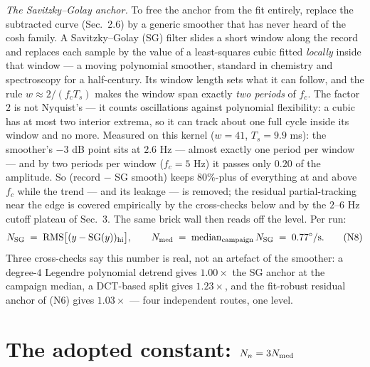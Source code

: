 \documentclass[10pt]{article}
\newcommand{\rms}{\mathrm{RMS}}
\begin{document}
\emph{The Savitzky--Golay anchor.} To free the anchor from the fit
entirely, replace the subtracted curve (Sec.~2.6) by a generic
smoother that has never heard of the cosh family. A Savitzky--Golay
(SG) filter slides a short window along the record and replaces each
sample by the value of a least-squares cubic fitted \emph{locally}
inside that window --- a moving polynomial smoother, standard in
chemistry and spectroscopy for a half-century. Its window length sets
what it can follow, and the rule $w \approx 2/(f_c T_s)$ makes the
window span exactly \emph{two periods} of $f_c$. The factor $2$ is
not Nyquist's --- it counts oscillations against polynomial
flexibility: a cubic has at most two interior extrema, so it can
track about one full cycle inside its window and no more. Measured
on this kernel ($w = 41$, $T_s = 9.9$ ms): the smoother's $-3$ dB
point sits at $2.6$ Hz --- almost exactly one period per window ---
and by two periods per window ($f_c = 5$ Hz) it passes only $0.20$
of the amplitude. So (record $-$ SG smooth) keeps $80\%$-plus of
everything at and above $f_c$ while the trend --- and its leakage
--- is removed; the residual partial-tracking near the edge is
covered empirically by the cross-checks below and by the
$2$--$6$ Hz cutoff plateau of Sec.~3. The same brick wall then reads
off the level. Per run:
\begin{equation}
  N_{\rm SG} \;=\; \rms\big[(y - \mathrm{SG}(y))_{\rm hi}\big],
  \qquad
  N_{\rm med} \;=\; \mathrm{median}_{\rm campaign}\, N_{\rm SG}
  \;=\; 0.77^\circ/\text{s}.
  \tag{N8}
\end{equation}
Three cross-checks say this number is real, not an artefact of the
smoother: a degree-$4$ Legendre polynomial detrend gives
$1.00\times$ the SG anchor at the campaign median, a DCT-based split
gives $1.23\times$, and the fit-robust residual anchor of (N6) gives
$1.03\times$ --- four independent routes, one level.

\section{The adopted constant: $N_n = 3N_{\rm med}$}
\end{document}
